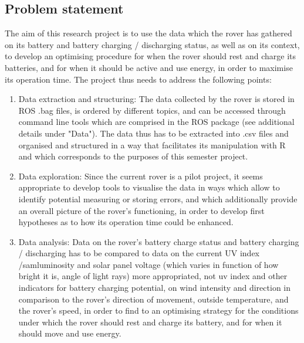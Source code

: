\documentclass[11pt, UKenglish]{report}
\begin{document}
{\subsection*{Problem statement}

The aim of this research project is to use the data which the rover has gathered on its battery and battery charging / discharging status, as well as on its context, to develop an optimising procedure for when the rover should rest and charge its batteries, and for when it should be active and use energy, in order to maximise its operation time. The project thus needs to address the following points:

\begin{enumerate}

	\item{\large{Data extraction and structuring:} \normalsize The data collected by the rover is stored in ROS .bag files, is ordered by different topics, and can be accessed through command line tools which are comprised in the ROS package (see additional details under "Data"). The data thus has to be extracted into .csv files and organised and structured in a way that facilitates its manipulation with R and which corresponds to the purposes of this semester project.}

	\item{\large{Data exploration:} \normalsize Since the current rover is a pilot project, it seems appropriate to develop tools to visualise the data in ways which allow to identify potential measuring or storing errors, and which additionally provide an overall picture of the rover's functioning, in order to develop first hypotheses as to how its operation time could be enhanced.}

	\item{\large{Data analysis:} \normalsize Data on the rover's battery charge status and battery charging / discharging has to be compared to data on the current UV index /sam{luminosity and solar panel voltage (which varies in function of how bright it is, angle of light rays) more appropriated, not uv index}  and other indicators for battery charging potential, on wind intensity and direction in comparison to the rover's direction of movement, outside temperature, and the rover's speed, in order to find to an optimising strategy for the conditions under which the rover should rest and charge its battery, and for when it should move and use energy.}


\end{enumerate}}
\end{document}
